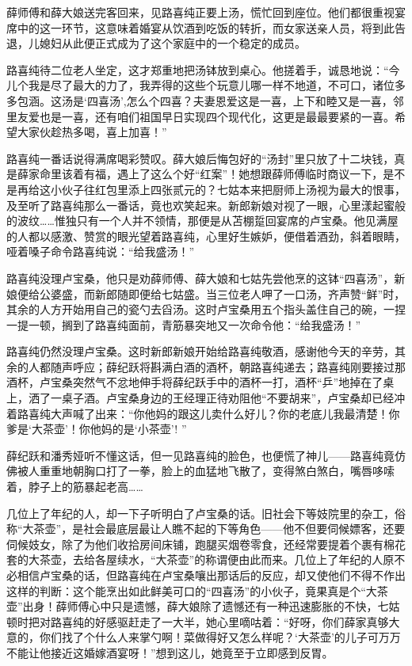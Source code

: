 \par 薛师傅和薛大娘送完客回来，见路喜纯正要上汤，慌忙回到座位。他们都很重视宴席中的这一环节，这意味着婚宴从饮酒到吃饭的转折，而女家送亲人员，将到此告退，儿媳妇从此便正式成为了这个家庭中的一个稳定的成员。
\par 路喜纯待二位老人坐定，这才郑重地把汤钵放到桌心。他搓着手，诚恳地说：“今儿个我是尽了最大的力了，我弄得的这些个玩意儿哪一样不地道，不可口，诸位多多包涵。这汤是‘四喜汤’,怎么个四喜？夫妻恩爱这是一喜，上下和睦又是一喜，邻里友爱也是一喜，还有咱们祖国早日实现四个现代化，这更是最最要紧的一喜。希望大家伙趁热多喝，喜上加喜！”
\par 路喜纯一番话说得满席喝彩赞叹。薛大娘后悔包好的“汤封”里只放了十二块钱，真是薛家命里该着有福，遇上了这么个好“红案”！她想跟薛师傅临时商议一下，是不是再给这小伙子往红包里添上四张贰元的？七姑本来把厨师上汤视为最大的恨事，及至听了路喜纯那么一番话，竟也欢笑起来。新郎新娘对视了一眼，心里漾起蜜般的波纹……惟独只有一个人并不领情，那便是从苫棚踅回宴席的卢宝桑。他见满屋的人都以感激、赞赏的眼光望着路喜纯，心里好生嫉妒，便借着酒劲，斜着眼睛，哑着嗓子命令路喜纯说：“给我盛汤！”
\par 路喜纯没理卢宝桑，他只是劝薛师傅、薛大娘和七姑先尝他烹的这钵“四喜汤”，新娘便给公婆盛，而新郎随即便给七姑盛。当三位老人呷了一口汤，齐声赞“鲜”时，其余的人方开始用自己的瓷勺去舀汤。这时卢宝桑用五个指头盖住自己的碗，一捏一提一顿，搁到了路喜纯面前，青筋暴突地又一次命令他：“给我盛汤！”
\par 路喜纯仍然没理卢宝桑。这时新郎新娘开始给路喜纯敬酒，感谢他今天的辛劳，其余的人都随声呼应；薛纪跃将斟满白酒的酒杯，朝路喜纯递去；路喜纯刚要接过那酒杯，卢宝桑突然气不忿地伸手将薛纪跃手中的酒杯一打，酒杯“乒”地掉在了桌上，洒了一桌子酒。卢宝桑身边的王经理正待劝阻他“不要胡来”，卢宝桑却已经冲着路喜纯大声喊了出来：“你他妈的跟这儿卖什么好儿？你的老底儿我最清楚！你爹是‘大茶壶’！你他妈的是‘小茶壶’! ”
\par 薛纪跃和潘秀娅听不懂这话，但一见路喜纯的脸色，也便慌了神儿——路喜纯竟仿佛被人重重地朝胸口打了一拳，脸上的血猛地飞散了，变得煞白煞白，嘴唇哆嗦着，脖子上的筋暴起老高……
\par 几位上了年纪的人，却一下子听明白了卢宝桑的话。旧社会下等妓院里的杂工，俗称“大茶壶”，是社会最底层最让人瞧不起的下等角色——他不但要伺候嫖客，还要伺候妓女，除了为他们收拾房间床铺，跑腿买烟卷零食，还经常要提着个裹有棉花套的大茶壶，去给各屋续水，“大茶壶”的称谓便由此而来。几位上了年纪的人原不必相信卢宝桑的话，但路喜纯在卢宝桑嚷出那话后的反应，却又使他们不得不作出这样的判断：这个能烹出如此鲜美可口的“四喜汤”的小伙子，竟果真是个“大茶壶”出身！薛师傅心中只是遗憾，薛大娘除了遗憾还有一种迅速膨胀的不快，七姑顿时把对路喜纯的好感驱赶走了一大半，她心里嘀咕着：“好呀，你们薛家真够大意的，你们找了个什么人来掌勺啊！菜做得好又怎么样呢？‘大茶壶’的儿子可万万不能让他接近这婚嫁酒宴呀！”想到这儿，她竟至于立即感到反胃。
